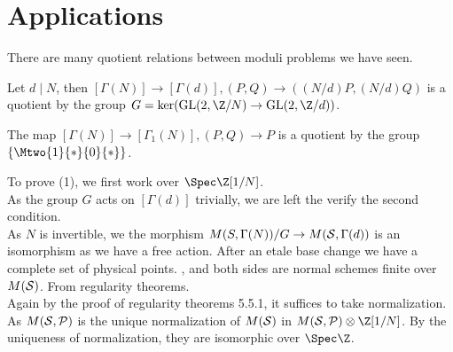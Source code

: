 \section{Applications}
There are many quotient relations between moduli problems we have seen.
\begin{theorem}
	\item Let $d\mid N$, then $[\Gamma(N)]\to[\Gamma(d)], (P,Q)\to ((N/d)P,(N/d)Q)$ is a quotient by the group $G = \ker(\text{GL}(2,\Z/N)\to \text{GL}(2,\Z/d))$.
	\item The map $[\Gamma(N)]\to[\Gamma_1(N)], (P,Q)\to P$ is a quotient by the group $\{\Mtwo{1}{*}{0}{*}\}$.
\end{theorem}
To prove (1), we first work over $\Spec \Z[1/N]$. \\
As the group $G$ acts on $[\Gamma(d)]$ trivially, we are left the verify the second condition. \\
As $N$ is invertible, we the morphism $M(S,\Gamma(N))/G\to M(\mathcal{S}, \Gamma(d))$ is an isomorphism as we have a free action. {After an etale base change we have a complete set of physical points. }, and both sides are normal schemes finite over $M(\mathcal{S})$. {From regularity theorems}. \\
Again by the proof of regularity theorems 5.5.1, it suffices to take normalization. \\
As $M(\mathcal{S},\mathcal{P})$ is the unique normalization of $M(\mathcal{S})$ in $M(\cS,\cP)\otimes \Z[1/N]$.
By the uniqueness of normalization, they are isomorphic over $\Spec \Z$. \\
